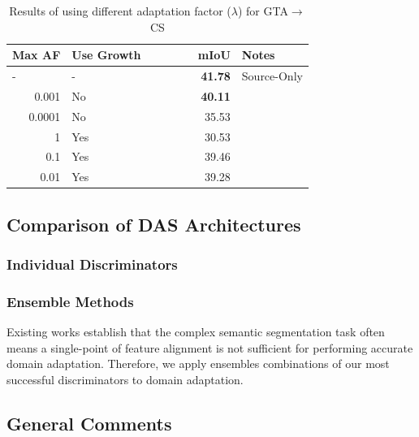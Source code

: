 \documentclass[a4paper,12pt]{report}
\begin{document}
\begin{table}[]
    \centering
    \begin{tabular}{|r|l|r|l|}
        \hline
        \multicolumn{1}{|l|}{Max AF} & Use Growth & \multicolumn{1}{l|}{\ \ \ \ \ \ \ mIoU} & Notes       \\ \hline
        \multicolumn{1}{|l|}{-}      & -          & \textbf{41.78}                          & Source-Only \\ \hline
        0.001                        & No         & \textbf{40.11}                          &             \\ \hline
        0.0001                       & No         & 35.53                                   &             \\ \hline
        1                            & Yes        & 30.53                                   &             \\ \hline
        0.1                          & Yes        & 39.46                                   &             \\ \hline
        0.01                         & Yes        & 39.28                                   &             \\ \hline
    \end{tabular}
    \caption{Results of using different adaptation factor ($\lambda$) for GTA$\rightarrow$CS}
\end{table}

\subsection{Comparison of DAS Architectures}

\subsubsection{Individual Discriminators}


\subsubsection{Ensemble Methods}
Existing works \cite{chen_learning_2017} \cite{csurka_unsupervised_2021} \cite{ronneberger_u-net_2015} establish that the complex semantic segmentation task often means a single-point of feature alignment is not sufficient for performing accurate domain adaptation. Therefore, we apply ensembles combinations of our most successful discriminators to domain adaptation.

\subsection{General Comments}
\end{document}
